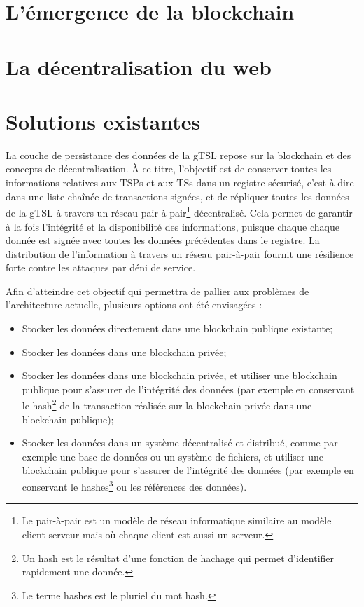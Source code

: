 \documentclass{tnreport}
\begin{document}
\section{L'émergence de la blockchain}

\section{La décentralisation du web}

\section{Solutions existantes}

La couche de persistance des données de la gTSL repose sur la blockchain et des concepts de décentralisation. À ce titre, l'objectif est de conserver toutes les informations relatives aux TSPs et aux TSs dans un registre sécurisé, c'est-à-dire dans une liste chaînée de transactions signées, et de répliquer toutes les données de la gTSL à travers un réseau pair-à-pair\footnote{Le pair-à-pair est un modèle de réseau informatique similaire au modèle client-serveur mais où chaque client est aussi un serveur.} décentralisé.
Cela permet de garantir à la fois l'intégrité et la disponibilité des informations, puisque chaque chaque donnée est signée avec toutes les données précédentes dans le registre. La distribution de l'information à travers un réseau pair-à-pair fournit une résilience forte contre les attaques par déni de service.

Afin d'atteindre cet objectif qui permettra de pallier aux problèmes de l'architecture actuelle, plusieurs options ont été envisagées :
\begin{itemize}
	\item Stocker les données directement dans une blockchain publique existante;
	\item Stocker les données dans une blockchain privée;
	\item Stocker les données dans une blockchain privée, et utiliser une blockchain publique pour s'assurer de l'intégrité des données (par exemple en conservant le hash\footnote{Un hash est le résultat d'une fonction de hachage qui permet d'identifier rapidement une donnée.} de la transaction réalisée sur la blockchain privée dans une blockchain publique);
	\item Stocker les données dans un système décentralisé et distribué, comme par exemple une base de données ou un système de fichiers, et utiliser une blockchain publique pour s'assurer de l'intégrité des données (par exemple en conservant le hashes\footnote{Le terme hashes est le pluriel du mot hash.} ou les références des données).
\end{itemize}
\end{document}
